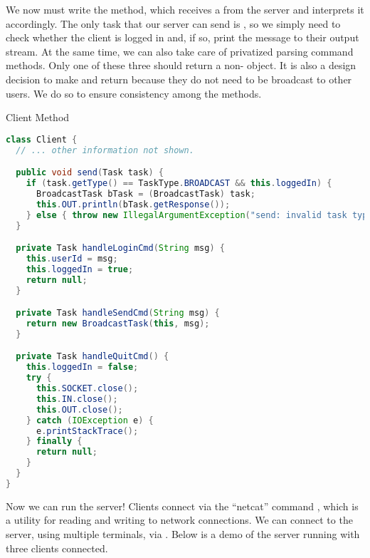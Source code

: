 We now must write the   method, which receives a  from the server and interprets it accordingly. The only task that our server can send is , so we simply need to check whether the client is logged in and, if so, print the message to their output stream. At the same time, we can also take care of privatized parsing command methods. Only one of these three should return a non- object. It is also a design decision to make  and  return  because they do not need to be broadcast to other users. We do so to ensure consistency among the methods.

\begin{cl}{Client  Method}
\begin{lstlisting}[language=Java]
class Client {
  // ... other information not shown.

  public void send(Task task) {
    if (task.getType() == TaskType.BROADCAST && this.loggedIn) {
      BroadcastTask bTask = (BroadcastTask) task;
      this.OUT.println(bTask.getResponse());
    } else { throw new IllegalArgumentException("send: invalid task type " + task.getType()); }
  }

  private Task handleLoginCmd(String msg) {
    this.userId = msg;
    this.loggedIn = true;
    return null;
  }

  private Task handleSendCmd(String msg) {
    return new BroadcastTask(this, msg);
  }

  private Task handleQuitCmd() {
    this.loggedIn = false;
    try {
      this.SOCKET.close();
      this.IN.close();
      this.OUT.close();
    } catch (IOException e) { 
      e.printStackTrace(); 
    } finally {
      return null;
    }
  }
}
\end{lstlisting}
\end{cl}

Now we can run the server! Clients connect via the ``netcat'' command , which is a utility for reading and writing to network connections. We can connect to the server, using multiple terminals, via . Below is a demo of the server running with three clients connected.